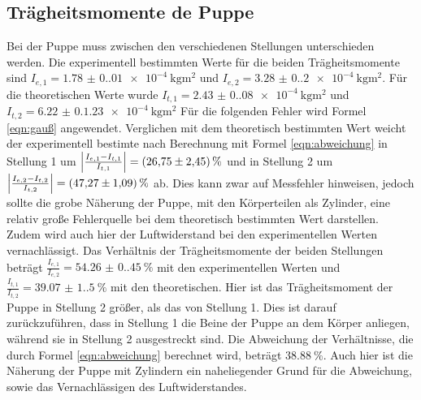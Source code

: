     \subsection{Trägheitsmomente de Puppe}
    Bei der Puppe muss zwischen den verschiedenen Stellungen unterschieden werden.
    Die experimentell bestimmten Werte für die beiden Trägheitsmomente sind $I_{e,1}=\qty{1.78(0.01)e-4}{\kilo\gram\meter\squared}$ und $I_{e,2}=\qty{3.28(0.2)e-4}{\kilo\gram\meter\squared}$.
    Für die theoretischen Werte wurde $I_{t,1}=\qty{2.43(0.08)e-4}{\kilo\gram\meter\squared}$ und $I_{t,2}=\qty{6.22(0.123)e-4}{\kilo\gram\meter\squared}$
    Für die folgenden Fehler wird Formel \ref{eqn:gauß} angewendet.
    Verglichen mit dem theoretisch bestimmten Wert weicht der experimentell bestimte nach Berechnung mit Formel \ref{eqn:abweichung} in Stellung 1 um $\Bigl|\frac{I_{e,1}-I_{t,1}}{I_{t,1}}\Bigr|=\qty{26.75(2.45)}{\percent}$ und in Stellung 2 um $\Bigl|\frac{I_{e,2}-I_{t,2}}{I_{t,2}}\Bigr|=\qty{47.27(1.09)}{\percent}$ ab.
    Dies kann zwar auf Messfehler hinweisen, jedoch sollte die grobe Näherung der Puppe, mit den Körperteilen als Zylinder, eine relativ große Fehlerquelle bei dem theoretisch bestimmten Wert darstellen.
    Zudem wird auch hier der Luftwiderstand bei den experimentellen Werten vernachlässigt.
    Das Verhältnis der Trägheitsmomente der beiden Stellungen beträgt $\frac{I_{e,1}}{I_{e,2}}=\qty{54.26(0.45)}{\percent}$ mit den experimentellen Werten und $\frac{I_{t,1}}{I_{t,2}}=\qty{39.07(1.5)}{\percent}$ mit den theoretischen.
    Hier ist das Trägheitsmoment der Puppe in Stellung 2 größer, als das von Stellung 1. 
    Dies ist darauf zurückzuführen, dass in Stellung 1 die Beine der Puppe an dem Körper anliegen, während sie in Stellung 2 ausgestreckt sind.
    Die Abweichung der Verhältnisse, die durch Formel \ref{eqn:abweichung} berechnet wird, beträgt $\qty{38.88}{\percent}$.
    Auch hier ist die Näherung der Puppe mit Zylindern ein naheliegender Grund für die Abweichung, sowie das Vernachlässigen des Luftwiderstandes.
    